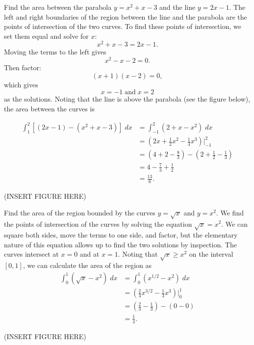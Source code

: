 \documentclass{ximera}
\begin{document}
\begin{example}
Find the area between the parabola $y = x^2 + x - 3$ and the line $y = 2x - 1$. The left and right boundaries of the region between the line and the parabola are 
the points of intersection of the two curves. To find these points of intersection, we set them equal and solve for $x$:
\[
x^2 + x - 3 = 2x-1.
\]
Moving the terms to the left gives
\[
 x^2 -x -2 = 0.
 \]
 Then factor:
 \[
  (x+1)(x-2) = 0,
  \]
  which gives
  \[
   x = -1 \;\text{and}\; x= 2
   \]
   as the solutions.
Noting that the line is above the parabola (see the figure below), the area between the curves is 

\begin{align*}
\int_1^2 \left[(2x - 1) - (x^2 + x - 3)\right] \; dx &= \int_{-1}^2 \left(2 + x - x^2\right) \; dx \\
                                           &= \left(2x + \frac12 x^2 - \frac13 x^3 \right) \bigg|_{-1}^2 \\
                                           &= \left(4 + 2 - \frac83 \right) - \left(2 + \frac12 - \frac13 \right)\\
                                           &= 4 - \frac73 + \frac12 \\
                                           & = \frac{13}{6}.
\end{align*}

(INSERT FIGURE HERE)

\end{example}

\begin{example}
Find the area of the region bounded by the curves $y = \sqrt x$ and $y = x^2$.
We find the points of intersection of the curves by solving the equation $\sqrt x = x^2$.
We can square both sides, move the terms to one side, and factor, but the elementary nature of this equation allows up 
to find the two solutions by inspection.  The curves intersect at $x = 0$ and at $x = 1$.
Noting that $\sqrt x \geq x^2$ on the interval $[0,1]$, we can calculate the area of the region as
\begin{align*}
\int_0^1 \left(\sqrt x - x^2 \right) \; dx &= \int_0^1 \left(x^{1/2} - x^2 \right) \; dx  \\
                                          &=  \left(\frac23 x^{3/2} - \frac13 x^3 \right) \bigg|_0^1 \\
                                          &=  \left( \tfrac23 - \tfrac13 \right) - (0-0) \\
                                          &= \frac13.
\end{align*}

(INSERT FIGURE HERE)

\end{example}
\end{document}
